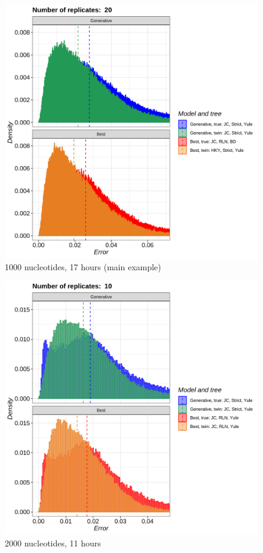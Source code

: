 \begin{figure}[H]
  \includegraphics[width=\textwidth]{pirouette_example_28/errors.png}
  \caption{1000 nucleotides, 17 hours (main example)}
\end{figure}

\begin{figure}[H]
  \includegraphics[width=\textwidth]{pirouette_example_34/errors.png}
  \caption{2000 nucleotides, 11 hours}
\end{figure}


